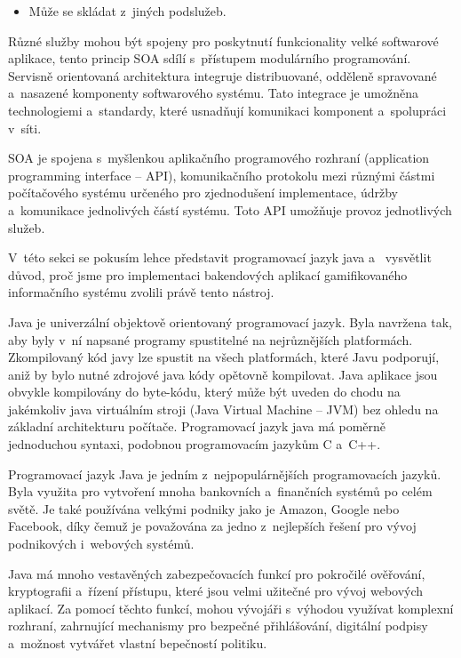 \documentclass[12pt]{article}
\begin{document}
{\begin{itemize}
\item Může se skládat z~jiných podslužeb.

\end{itemize}

Různé služby mohou být spojeny pro poskytnutí funkcionality velké softwarové aplikace,
tento princip SOA sdílí s~přístupem modulárního programování. 
Servisně orientovaná architektura integruje distribuované,
odděleně spravované a~nasazené komponenty softwarového systému.
Tato integrace je umožněna technologiemi a~standardy, které usnadňují
komunikaci komponent a~spolupráci v~síti.

SOA je spojena s~myšlenkou aplikačního programového rozhraní
(application programming interface -- API), komunikačního protokolu mezi 
různými částmi počítačového systému určeného pro zjednodušení implementace, 
údržby a~komunikace jednolivých částí systému. 
Toto API umožňuje provoz jednotlivých služeb.

V~této sekci se pokusím lehce představit programovací jazyk java a~
vysvětlit důvod, proč jsme pro implementaci bakendových aplikací
gamifikovaného informačního systému zvolili právě tento nástroj.

Java
je univerzální objektově orientovaný programovací jazyk. 
Byla navržena tak, aby byly v~ní napsané programy spustitelné na nejrůznějších platformách.
Zkompilovaný kód javy lze spustit na všech platformách, které Javu podporují,
aniž by bylo nutné zdrojové java kódy opětovně kompilovat.
Java aplikace jsou obvykle kompilovány do byte-kódu, 
který může být uveden do chodu na jakémkoliv java virtuálním stroji
(Java Virtual Machine -- JVM) bez ohledu na základní architekturu počítače.
Programovací jazyk java má poměrně jednoduchou syntaxi, 
podobnou programovacím jazykům C a~C++. 

Programovací jazyk Java je jedním z~nejpopulárnějších programovacích jazyků.
Byla využita pro vytvoření mnoha bankovních a~finančních systémů po celém světě.
Je také používána velkými podniky jako je Amazon, Google nebo Facebook,
díky čemuž je považována za jedno z~nejlepších řešení pro vývoj podnikových i~webových systémů.

Java má mnoho vestavěných zabezpečovacích funkcí pro pokročilé ověřování,
kryptografii a~řízení přístupu, které jsou velmi užitečné pro vývoj webových aplikací.
Za pomocí těchto funkcí, mohou vývojáři s~výhodou využívat komplexní
rozhraní, zahrnující mechanismy pro bezpečné přihlášování, digitální podpisy a~možnost vytvářet vlastní bepečností politiku.

}
\end{document}

